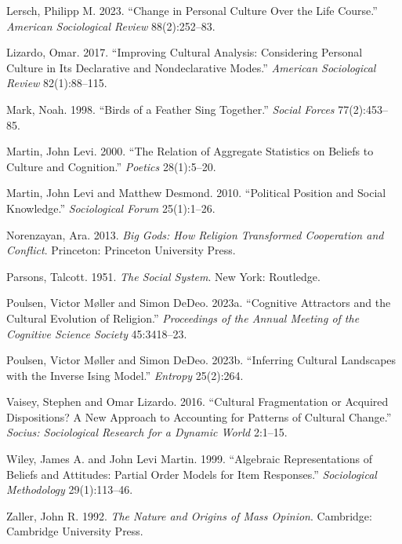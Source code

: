 \documentclass[
  11pt,
]{article}
\newlength{\cslhangindent}
\newlength{\cslentryspacingunit} %
\newenvironment{CSLReferences}[2] %
 {%
  \setlength{\parindent}{0pt}
  \ifodd #1
  \let\oldpar\par
  \def\par{\hangindent=\cslhangindent\oldpar}
  \fi
  \setlength{\parskip}{#2\cslentryspacingunit}
 }%
 {}
\begin{document}
\begin{CSLReferences}{1}{0}
\leavevmode{}%
Lersch, Philipp M. 2023. {``Change in {Personal} {Culture} {Over} the
{Life} {Course}.''} \emph{American Sociological Review} 88(2):252--83.

\leavevmode{}%
Lizardo, Omar. 2017. {``Improving {Cultural} {Analysis}: {Considering}
{Personal} {Culture} in Its {Declarative} and {Nondeclarative}
{Modes}.''} \emph{American Sociological Review} 82(1):88--115.

\leavevmode{}%
Mark, Noah. 1998. {``Birds of a {Feather} {Sing} {Together}.''}
\emph{Social Forces} 77(2):453--85.

\leavevmode{}%
Martin, John Levi. 2000. {``The {Relation} of {Aggregate} {Statistics}
on {Beliefs} to {Culture} and {Cognition}.''} \emph{Poetics}
28(1):5--20.

\leavevmode{}%
Martin, John Levi and Matthew Desmond. 2010. {``Political {Position} and
{Social} {Knowledge}.''} \emph{Sociological Forum} 25(1):1--26.

\leavevmode{}%
Norenzayan, Ara. 2013. \emph{Big {Gods}: {How} {Religion} {Transformed}
{Cooperation} and {Conflict}}. Princeton: Princeton University Press.

\leavevmode{}%
Parsons, Talcott. 1951. \emph{The {Social} {System}}. New York:
Routledge.

\leavevmode{}%
Poulsen, Victor Møller and Simon DeDeo. 2023a. {``Cognitive Attractors
and the Cultural Evolution of Religion.''} \emph{Proceedings of the
Annual Meeting of the Cognitive Science Society} 45:3418--23.

\leavevmode{}%
Poulsen, Victor Møller and Simon DeDeo. 2023b. {``Inferring Cultural
Landscapes with the Inverse Ising Model.''} \emph{Entropy} 25(2):264.

\leavevmode{}%
Vaisey, Stephen and Omar Lizardo. 2016. {``Cultural {Fragmentation} or
{Acquired} {Dispositions}? {A} {New} {Approach} to {Accounting} for
{Patterns} of {Cultural} {Change}.''} \emph{Socius: Sociological
Research for a Dynamic World} 2:1--15.

\leavevmode{}%
Wiley, James A. and John Levi Martin. 1999. {``Algebraic
{Representations} of {Beliefs} and {Attitudes}: {Partial} {Order}
{Models} for {Item} {Responses}.''} \emph{Sociological Methodology}
29(1):113--46.

\leavevmode{}%
Zaller, John R. 1992. \emph{The {Nature} and {Origins} of {Mass}
{Opinion}}. Cambridge: Cambridge University Press.

\end{CSLReferences}
\end{document}
